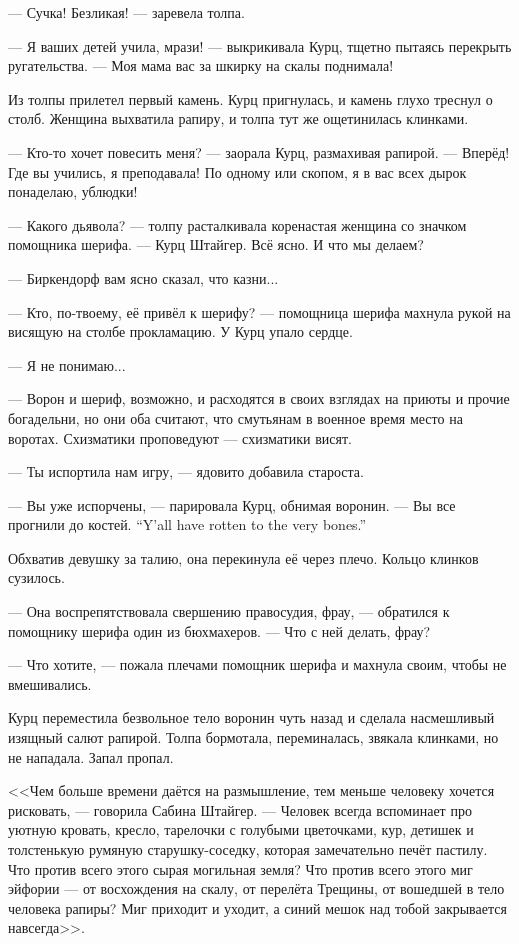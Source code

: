 --- Сучка!
Безликая! --- заревела толпа.

--- Я ваших детей учила, мрази! --- выкрикивала Курц, тщетно пытаясь перекрыть ругательства.
--- Моя мама вас за шкирку на скалы поднимала!

Из толпы прилетел первый камень.
Курц пригнулась, и камень глухо треснул о столб.
Женщина выхватила рапиру, и толпа тут же ощетинилась клинками.

--- Кто-то хочет повесить меня? --- заорала Курц, размахивая рапирой.
--- Вперёд!
Где вы учились, я преподавала!
По одному или скопом, я в вас всех дырок понаделаю, ублюдки!

--- Какого дьявола? --- толпу расталкивала коренастая женщина со значком помощника шерифа.
--- Курц Штайгер.
Всё ясно.
И что мы делаем?

--- Биркендорф вам ясно сказал, что казни...

--- Кто, по-твоему, её привёл к шерифу? --- помощница шерифа махнула рукой на висящую на столбе прокламацию.
У Курц упало сердце.

--- Я не понимаю...

--- Ворон и шериф, возможно, и расходятся в своих взглядах на приюты и прочие богадельни, но они оба считают, что смутьянам в военное время место на воротах.
Схизматики проповедуют --- схизматики висят.

--- Ты испортила нам игру, --- ядовито добавила староста.

--- Вы уже испорчены, --- парировала Курц, обнимая воронин.
{--- Вы все прогнили до костей.}
{``Y'all have rotten to the very bones.''}

Обхватив девушку за талию, она перекинула её через плечо.
Кольцо клинков сузилось.

--- Она воспрепятствовала свершению правосудия, фрау, --- обратился к помощнику шерифа один из бюхмахеров.
--- Что с ней делать, фрау?

--- Что хотите, --- пожала плечами помощник шерифа и махнула своим, чтобы не вмешивались.

Курц переместила безвольное тело воронин чуть назад и сделала насмешливый изящный салют рапирой.
Толпа бормотала, переминалась, звякала клинками, но не нападала.
Запал пропал.

<<Чем больше времени даётся на размышление, тем меньше человеку хочется рисковать, --- говорила Сабина Штайгер.
--- Человек всегда вспоминает про уютную кровать, кресло, тарелочки с голубыми цветочками, кур, детишек и толстенькую румяную старушку-соседку, которая замечательно печёт пастилу.
Что против всего этого сырая могильная земля?
Что против всего этого миг эйфории --- от восхождения на скалу, от перелёта Трещины, от вошедшей в тело человека рапиры?
Миг приходит и уходит, а синий мешок над тобой закрывается навсегда>>.

